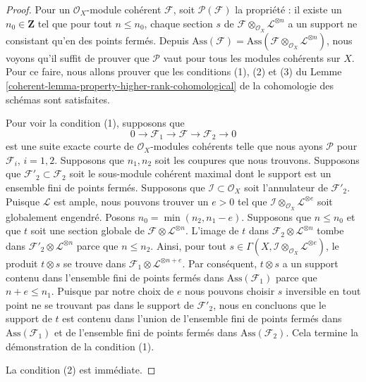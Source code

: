 \begin{proof}
Pour un $\mathcal{O}_X$-module cohérent
$\mathcal{F}$, soit $\mathcal{P}(\mathcal{F})$ la
propriété : il existe un $n_0 \in \mathbf{Z}$ tel
que pour tout $n \leq n_0$, chaque section $s$ de
$\mathcal{F} \otimes_{\mathcal{O}_X}
\mathcal{L}^{\otimes n}$ a un support ne consistant
qu’en des points fermés. Depuis
$\text{Ass}(\mathcal{F}) = \text{Ass}(\mathcal{F}
\otimes_{\mathcal{O}_X} \mathcal{L}^{\otimes n})$, nous
voyons qu’il suffit de prouver que $\mathcal{P}$ vaut
pour tous les modules cohérents sur $X$. Pour ce faire,
nous allons prouver que les conditions (1), (2) et (3)
du Lemme
\ref{coherent-lemma-property-higher-rank-cohomological} de la cohomologie des schémas sont satisfaites.

\medskip\noindent
Pour voir la condition (1), supposons que
$$
0 \to \mathcal{F}_1 \to \mathcal{F} \to \mathcal{F}_2 \to 0
$$
est une suite exacte courte de $\mathcal{O}_X$-modules
cohérents telle que nous ayons $\mathcal{P}$ pour
$\mathcal{F}_i$, $i = 1, 2$. Supposons que $n_1, n_2$ soit les
coupures que nous trouvons. Supposons que $\mathcal{F}'_2
\subset \mathcal{F}_2$ soit le sous-module cohérent maximal
dont le support est un ensemble fini de points fermés.
Supposons que $\mathcal{I} \subset \mathcal{O}_X$ soit
l'annulateur de $\mathcal{F}'_2$. Puisque $\mathcal{L}$ est
ample, nous pouvons trouver un $e > 0$ tel que $\mathcal{I}
\otimes_{\mathcal{O}_X} \mathcal{L}^{\otimes e}$ soit globalement
engendré. Posons $n_0 = \min(n_2, n_1 - e)$. Supposons que $n
\leq n_0$ et que $t$ soit une section globale de $\mathcal{F}
\otimes \mathcal{L}^{\otimes n}$. L'image de $t$ dans
$\mathcal{F}_2 \otimes \mathcal{L}^{\otimes n}$ tombe dans
$\mathcal{F}'_2 \otimes \mathcal{L}^{\otimes n}$ parce que $n \leq
n_2$. Ainsi, pour tout $s \in \Gamma(X, \mathcal{I}
\otimes_{\mathcal{O}_X} \mathcal{L}^{\otimes e})$, le produit $t
\otimes s$ se trouve dans $\mathcal{F}_1 \otimes \mathcal{L}^{\otimes
n + e}$. Par conséquent, $t \otimes s$ a un support contenu dans
l'ensemble fini de points fermés dans $\text{Ass}(\mathcal{F}_1)$
parce que $n + e \leq n_1$. Puisque par notre choix de $e$ nous
pouvons choisir $s$ inversible en tout point ne se trouvant pas dans le
support de $\mathcal{F}'_2$, nous en concluons que le support de $t$
est contenu dans l'union de l'ensemble fini de points fermés dans
$\text{Ass}(\mathcal{F}_1)$ et de l'ensemble fini de points fermés dans
$\text{Ass}(\mathcal{F}_2)$. Cela termine la démonstration de la condition (1).

\medskip\noindent
La condition (2) est immédiate.


\end{proof}
